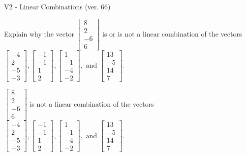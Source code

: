 \begin{exercise}
  \begin{exerciseTitle}V2 - Linear Combinations (ver. 66)\end{exerciseTitle}
  \begin{exerciseStatement}
    Explain why the vector \(\left[\begin{array}{c}
8 \\
2 \\
-6 \\
6
\end{array}\right]\)  is or is not a linear 
	combination of the vectors \(\left[\begin{array}{c}
-4 \\
2 \\
-5 \\
-3
\end{array}\right] , \left[\begin{array}{c}
-1 \\
-1 \\
1 \\
2
\end{array}\right] , \left[\begin{array}{c}
1 \\
-1 \\
-4 \\
-2
\end{array}\right] , \text{ and } \left[\begin{array}{c}
13 \\
-5 \\
14 \\
7
\end{array}\right]\).
	


  \end{exerciseStatement}
  \begin{exerciseAnswer}
   \(\left[\begin{array}{c}
8 \\
2 \\
-6 \\
6
\end{array}\right]\) 
  	 is not  
	a linear combination of the vectors \(\left[\begin{array}{c}
-4 \\
2 \\
-5 \\
-3
\end{array}\right] , \left[\begin{array}{c}
-1 \\
-1 \\
1 \\
2
\end{array}\right] , \left[\begin{array}{c}
1 \\
-1 \\
-4 \\
-2
\end{array}\right] , \text{ and } \left[\begin{array}{c}
13 \\
-5 \\
14 \\
7
\end{array}\right]\).


\end{exerciseAnswer}
\end{exercise}
